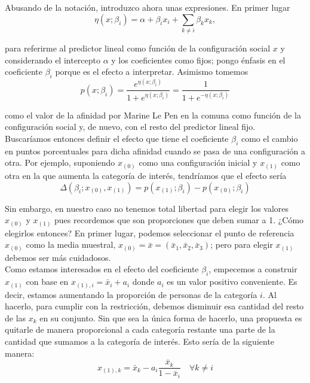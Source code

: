 Abusando de la notación, introduzco ahora unas expresiones. En primer lugar
\begin{equation*}
\eta(x;\beta_i)= \alpha + \beta_i x_i + \sum\limits_{k\neq i} \beta_k x_k, 
\end{equation*} 

para referirme al predictor lineal como función de la configuración social $x$ y considerando el intercepto $\alpha$ y los coeficientes como fijos; pongo énfasis en el coeficiente $\beta_i$ porque es el efecto a interpretar. Asimismo tomemos 
\begin{equation*}
p(x;\beta_i)=\dfrac{e^{\eta(x;\beta_i)}}{1+e^{\eta(x;\beta_i)}}=\dfrac{1}{1+e^{-\eta(x;\beta_i)}}
\end{equation*} 

como el valor de la afinidad por Marine Le Pen en la comuna como función de la configuración social y, de nuevo, con el resto del predictor lineal fijo.\\

 Buscaríamos entonces definir el efecto que tiene el coeficiente $\beta_i$ como el cambio en puntos porcentuales para dicha afinidad cuando se pasa de una configuración a otra. Por ejemplo, suponiendo $x_{(0)}$ como una configuración inicial y $x_{(1)}$ como otra en la que aumenta la categoría de interés, tendríamos que el efecto sería
\begin{equation*}
\Delta(\beta_i;x_{(0)},x_{(1)}) = p(x_{(1)};\beta_i)-p(x_{(0)};\beta_i)
\end{equation*}

Sin embargo, en nuestro caso no tenemos total libertad para elegir los valores $x_{(0)}$ y $x_{(1)}$ pues recordemos que son proporciones que deben sumar a 1. ¿Cómo elegirlos entonces? En primer lugar, podemos seleccionar el punto de referencia $x_{(0)}$ como la media muestral, $x_{(0)}=\bar{x}=(\bar{x}_1,\bar{x}_2,\bar{x}_3)$; pero para elegir $x_{(1)}$ debemos ser más cuidadosos.\\ 

Como estamos interesados en el efecto del coeficiente $\beta_i$, empecemos a construir $x_{(1)}$ con base en $x_{(1),i}=\bar{x}_i + a_i$ donde $a_i$ es un valor positivo conveniente. Es decir, estamos aumentando la proporción de personas de la categoría $i$. Al hacerlo, para cumplir con la restricción, debemos disminuir esa cantidad del resto de las $x_k$ en su conjunto. Sin que sea la única forma de hacerlo, una propuesta es quitarle de manera proporcional a cada categoría restante una parte de la cantidad que sumamos a la categoría de interés. Esto sería de la siguiente manera: 
\begin{equation*}
x_{(1),k}=\bar{x}_k - a_i \dfrac{\bar{x}_k}{1-\bar{x}_i} \quad \forall k \neq i
\end{equation*}


